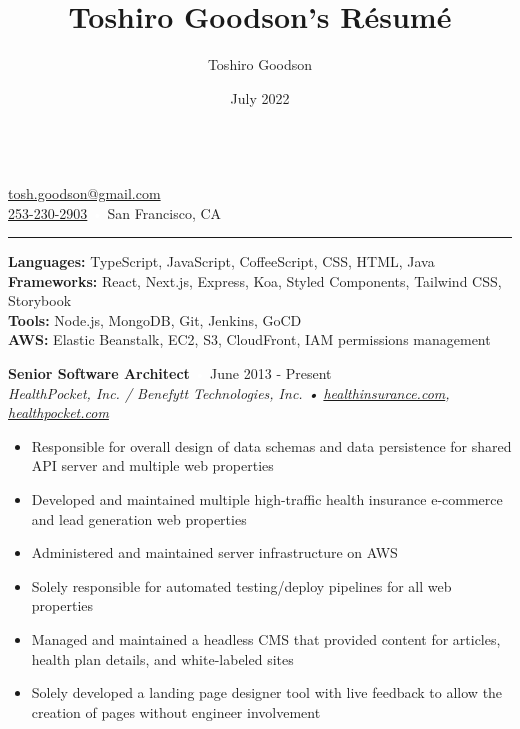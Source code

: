 \documentclass{resume}
\title{Toshiro Goodson's Résumé}
\author{Toshiro Goodson}
\date{July 2022}
\begin{document}
\color{content}
{\Large{}}\\
\href{mailto:tosh.goodson@gmail.com}{\color{content}tosh.goodson@gmail.com}\\
\href{tel:+12532302903}{\color{content}253-230-2903}
\hfill{\textcolor{white}{•}} %
\hfill{San Francisco, CA}

\nointerlineskip
\rule{\textwidth}{1pt}

\nointerlineskip
\colorbox{headerbg1}{\hspace{\linewidth}\hspace{-2\fboxsep}}

\textbf{Languages:} TypeScript, JavaScript, CoffeeScript, CSS, HTML, Java\\
\textbf{Frameworks:} React, Next.js, Express, Koa, Styled Components, Tailwind CSS, Storybook\\
\textbf{Tools:} Node.js, MongoDB, Git, Jenkins, GoCD\\
\textbf{AWS:} Elastic Beanstalk, EC2, S3, CloudFront, IAM permissions management

\bigskip

\colorbox{headerbg2}{\hspace{\linewidth}\hspace{-2\fboxsep}}

\textbf{Senior Software Architect}
\hfill{\textcolor{white}{•} June 2013 - Present}\\
\textit{HealthPocket, Inc. / Benefytt Technologies, Inc. • \href{https://www.healthinsurance.com}{healthinsurance.com}, \href{https://www.healthpocket.com}{healthpocket.com}}

\nointerlineskip
\begin{itemize}
	\item Responsible for overall design of data schemas and data persistence for shared API server and multiple web properties
	\item Developed and maintained multiple high-traffic health insurance e-commerce and lead generation web properties
	\item Administered and maintained server infrastructure on AWS
	\item Solely responsible for automated testing/deploy pipelines for all web properties
	\item Managed and maintained a headless CMS that provided content for articles, health plan details, and white-labeled sites
	\item Solely developed a landing page designer tool with live feedback to allow the creation of pages without engineer involvement
\end{itemize}
\end{document}
